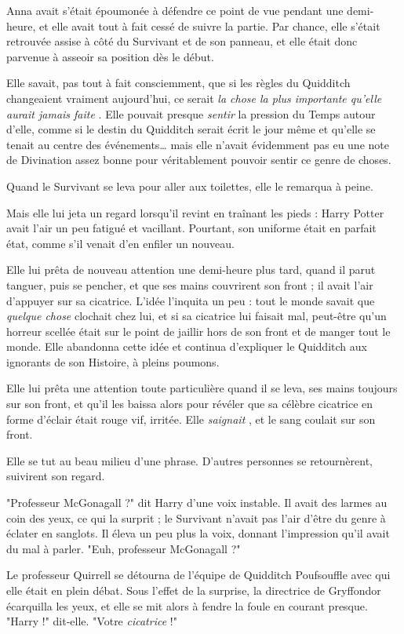 Anna avait s'était époumonée à défendre ce point de vue pendant une demi-heure, et elle avait tout à fait cessé de suivre la partie. Par chance, elle s'était retrouvée assise à côté du Survivant et de son panneau, et elle était donc parvenue à asseoir sa position dès le début.

Elle savait, pas tout à fait consciemment, que si les règles du Quidditch changeaient vraiment aujourd'hui, ce serait \emph{la chose la plus importante qu'elle aurait jamais faite} . Elle pouvait presque \emph{sentir}  la pression du Temps autour d'elle, comme si le destin du Quidditch serait écrit le jour même et qu'elle se tenait au centre des événements… mais elle n'avait évidemment pas eu une note de Divination assez bonne pour véritablement pouvoir sentir ce genre de choses.

Quand le Survivant se leva pour aller aux toilettes, elle le remarqua à peine.

Mais elle lui jeta un regard lorsqu'il revint en traînant les pieds : Harry Potter avait l'air un peu fatigué et vacillant. Pourtant, son uniforme était en parfait état, comme s'il venait d'en enfiler un nouveau.

Elle lui prêta de nouveau attention une demi-heure plus tard, quand il parut tanguer, puis se pencher, et que ses mains couvrirent son front ; il avait l'air d'appuyer sur sa cicatrice. L'idée l'inquita un peu : tout le monde savait que \emph{quelque chose}  clochait chez lui, et si sa cicatrice lui faisait mal, peut-être qu'un horreur scellée était sur le point de jaillir hors de son front et de manger tout le monde. Elle abandonna cette idée et continua d'expliquer le Quidditch aux ignorants de son Histoire, à pleins poumons.

Elle lui prêta une attention toute particulière quand il se leva, ses mains toujours sur son front, et qu'il les baissa alors pour révéler que sa célèbre cicatrice en forme d'éclair était rouge vif, irritée. Elle \emph{saignait} , et le sang coulait sur son front.

Elle se tut au beau milieu d'une phrase. D'autres personnes se retournèrent, suivirent son regard.

"Professeur McGonagall ?" dit Harry d'une voix instable. Il avait des larmes au coin des yeux, ce qui la surprit ; le Survivant n'avait pas l'air d'être du genre à éclater en sanglots. Il éleva un peu plus la voix, donnant l'impression qu'il avait du mal à parler. "Euh, professeur McGonagall ?"

Le professeur Quirrell se détourna de l'équipe de Quidditch Poufsouffle avec qui elle était en plein débat. Sous l'effet de la surprise, la directrice de Gryffondor écarquilla les yeux, et elle se mit alors à fendre la foule en courant presque. "Harry !" dit-elle. "Votre \emph{cicatrice}  !"

